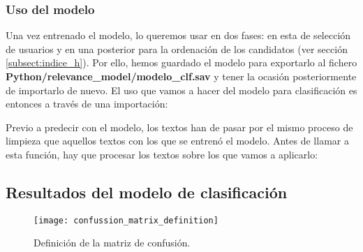 \subsubsection{Uso del modelo}
Una vez entrenado el modelo, lo queremos usar en dos fases: en esta de selección de 
usuarios y en una posterior para la ordenación de los candidatos (ver sección 
\ref{subsect:indice_h}). Por ello, hemos guardado el modelo para 
exportarlo al fichero {\bf Python/relevance\_model/modelo\_clf.sav}
y tener la ocasión posteriormente de importarlo de nuevo. El uso que
vamos a hacer del modelo para clasificación es entonces a través de 
una importación:


Previo a predecir con el modelo, los textos han de pasar por el mismo proceso de 
limpieza que aquellos textos con los que se entrenó el modelo. Antes de llamar
a esta función, hay que procesar los textos sobre los que vamos a aplicarlo:


\subsection{Resultados del modelo de clasificación}
\label{sect:ajuste_modelo_contenido_tuit}

\begin{wrapfigure}[14]{L}{0.5\textwidth}
\texttt{[image: confussion\_matrix\_definition]}
\caption{Definición de la matriz de confusión.}\label{fig:confussion_matrix_definition}
\end{wrapfigure} 

